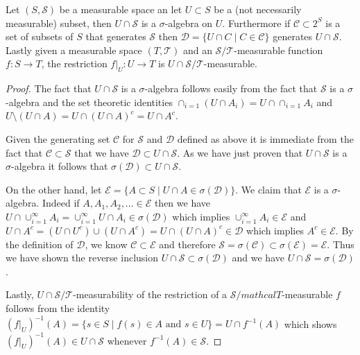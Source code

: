 \begin{lem}\label{RestrictionOfSigmaAlgebra}Let $(S, \mathcal{S})$ be a measurable space an let $U
  \subset S$ be a (not necessarily measurable) subset, then $U
  \cap \mathcal{S}$ is a $\sigma$-algebra on $U$.  Furthermore if
  $\mathcal{C} \subset 2^S$ is a set of subsets of $S$ that
  generates $\mathcal{S}$ then $\mathcal{D} = \lbrace U \cap C \mid C
  \in \mathcal{C} \rbrace$ generates $U \cap \mathcal{S}$.  Lastly
  given a measurable space $(T, \mathcal{T})$ and an $\mathcal{S}/\mathcal{T}$-measurable
  function $f : S \to T$, the restriction $f \vert_U : U \to T$ is $U
  \cap \mathcal{S}/\mathcal{T}$-measurable.
\end{lem}
\begin{proof}
The fact that $U \cap \mathcal{S}$ is a $\sigma$-algebra follows
easily from the fact that $\mathcal{S}$ is a $\sigma$-algebra and the set theoretic identities $\cap_{i=1} (U \cap A_i) = U
\cap \cap_{i=1} A_i$ and $U \setminus (U \cap A) = U \cap (U \cap A)^c
= U \cap A^c$.

Given the generating set $\mathcal{C}$ for $\mathcal{S}$ and
$\mathcal{D}$ defined as above it is immediate from the fact that
$\mathcal{C} \subset \mathcal{S}$ that we have $\mathcal{D} \subset U
\cap \mathcal{S}$.  As we have just proven that $U \cap \mathcal{S}$
is a $\sigma$-algebra it follows that $\sigma(\mathcal{D}) \subset U
\cap \mathcal{S}$.  

On the other hand, let $\mathcal{E} = \lbrace A
\subset S \mid U \cap A \in \sigma(\mathcal{D}) \rbrace$.  We
claim that $\mathcal{E}$ is a $\sigma$-algebra.  Indeed if $A, A_1, A_2,
\dotsc \in \mathcal{E}$ then we have $U \cap \cup_{i=1}^\infty A_i =
\cup_{i=1}^\infty U \cap A_i \in \sigma(\mathcal{D})$ which implies
$\cup_{i=1}^\infty A_i \in \mathcal{E}$ and $U \cap A^c
= (U \cap U^c) \cup (U \cap A^c) = U \cap (U \cap A)^c \in
\mathcal{D}$ which implies $A^c \in \mathcal{E}$.  By the definition
of $\mathcal{D}$, we know
$\mathcal{C} \subset \mathcal{E}$ and therefore $\mathcal{S} =
\sigma(\mathcal{C}) \subset \sigma(\mathcal{E}) = \mathcal{E}$.  Thus we have shown the
reverse inclusion $U \cap
\mathcal{S} \subset \sigma(\mathcal{D})$ and we have $U \cap
\mathcal{S} = \sigma(\mathcal{D})$.

Lastly, $U \cap \mathcal{S}/\mathcal{T}$-measurability of the
restriction of a
$\mathcal{S}/mathcal{T}$-measurable $f$ follows from the identity
$(f\vert_U)^{-1}(A) = \lbrace s \in S \mid f(s) \in A \text{ and } s
\in U \rbrace = U \cap f^{-1}(A)$ which shows $(f\vert_U)^{-1}(A) \in U \cap
\mathcal{S}$ whenever $f^{-1}(A) \in \mathcal{S}$.
\end{proof}

